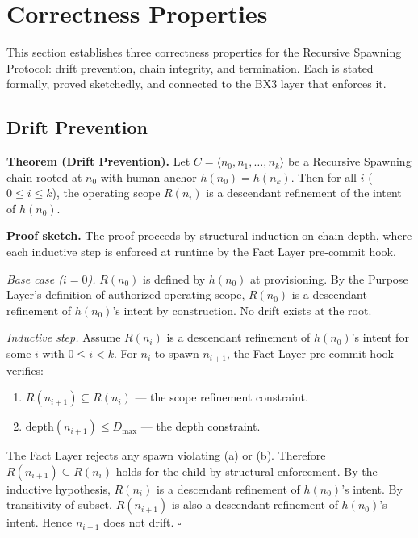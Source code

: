 \section{Correctness Properties}
\label{sec:rs-correctness}

This section establishes three correctness properties for the Recursive Spawning Protocol: drift prevention, chain integrity, and termination. Each is stated formally, proved sketchedly, and connected to the BX3 layer that enforces it.

\subsection{Drift Prevention}
\label{sec:rs-drift-prevention}

\medskip
\noindent\textbf{Theorem (Drift Prevention).} Let $C = \langle n_0, n_1, \ldots, n_k \rangle$ be a Recursive Spawning chain rooted at $n_0$ with human anchor $h(n_0) = h(n_k)$. Then for all $i$ ($0 \leq i \leq k$), the operating scope $R(n_i)$ is a descendant refinement of the intent of $h(n_0)$.

\medskip
\noindent\textbf{Proof sketch.} The proof proceeds by structural induction on chain depth, where each inductive step is enforced at runtime by the Fact Layer pre-commit hook.

\medskip
\textit{Base case ($i=0$).} $R(n_0)$ is defined by $h(n_0)$ at provisioning. By the Purpose Layer's definition of authorized operating scope, $R(n_0)$ is a descendant refinement of $h(n_0)$'s intent by construction. No drift exists at the root.

\medskip
\textit{Inductive step.} Assume $R(n_i)$ is a descendant refinement of $h(n_0)$'s intent for some $i$ with $0 \leq i < k$. For $n_i$ to spawn $n_{i+1}$, the Fact Layer pre-commit hook verifies:

\begin{enumerate}
    \item[(a)] $R(n_{i+1}) \subseteq R(n_i)$ — the scope refinement constraint.
    \item[(b)] $\mathrm{depth}(n_{i+1}) \leq D_{\mathrm{max}}$ — the depth constraint.
\end{enumerate}

The Fact Layer rejects any spawn violating (a) or (b). Therefore $R(n_{i+1}) \subseteq R(n_i)$ holds for the child by structural enforcement. By the inductive hypothesis, $R(n_i)$ is a descendant refinement of $h(n_0)$'s intent. By transitivity of subset, $R(n_{i+1})$ is also a descendant refinement of $h(n_0)$'s intent. Hence $n_{i+1}$ does not drift. $\square$

